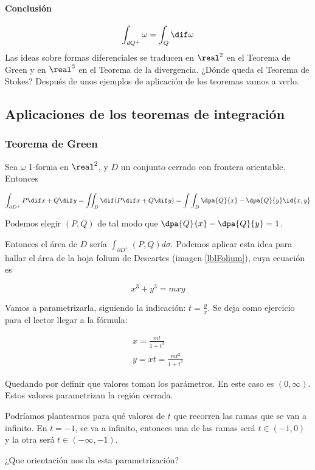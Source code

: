 \paragraph{Conclusión}
\[\int_{dQ^+} \omega = \int_{Q}\dif \omega\]
Las ideas sobre formas diferenciales se traducen en $\real^2$ en el Teorema de Green y en $\real^3$ en el Teorema de la divergencia. ¿Dónde queda el Teorema de Stokes? Después de unos ejemplos de aplicación de los teoremas vamos a verlo.

\subsection{Aplicaciones de los teoremas de integración}
\subsubsection{Teorema de Green}
Sea $\omega$ 1-forma en $\real^2$, y $D$ un conjunto cerrado con frontera orientable. Entonces

\[
\int_{\partial  D^+} P\dif x+Q\dif y = \iint_D \dif(P\dif x+Q\dif y) = \int\int_D \dpa{Q}{x} - \dpa{Q}{y}\id{x,y}
\]

\obs Podemos elegir $(P,Q)$ de tal modo que $\displaystyle \dpa{Q}{x}-\dpa{Q}{y} = 1$.

Entonces el área de $D$ sería $\displaystyle\int_{\partial  D^+} (P,Q)d\sigma$. Podemos aplicar esta idea para hallar el área de la hoja folium de Descartes (imagen \ref{lblFolium}), cuya ecuación es 

\[x^3+y^3 = mxy\]


Vamos a parametrizarla, siguiendo la indicación: $t = \frac{y}{x}$. Se deja como ejercicio para el lector llegar a la fórmula:

\begin{gather*}
x=\frac{mt}{1+t^3}\\
y= xt = \frac{mt^2}{1+t^3}
\end{gather*}

Quedando por definir que valores toman los parámetros. En este caso es $(0,\infty)$. Estos valores parametrizan la región cerrada. 

Podríamos plantearnos para qué valores de $t$ que recorren las ramas que se van a infinito. En $t=-1$, se va a infinito, entonces una de las ramas será $t\in(-1,0)$ y la otra será $t\in(-\infty,-1)$.

¿Que orientación nos da esta parametrización?

